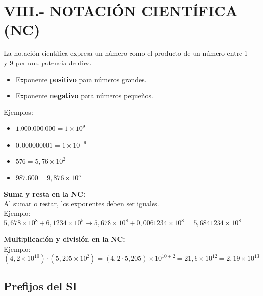 \documentclass[12pt,a4paper]{article}
\begin{document}
\section{VIII.- NOTACIÓN CIENTÍFICA (NC)}

La notación científica expresa un número como el producto de un número entre 1 y 9 por una potencia de diez. 
\begin{itemize}
    \item Exponente \textbf{positivo} para números grandes.
    \item Exponente \textbf{negativo} para números pequeños.
\end{itemize}

Ejemplos:
\begin{itemize}
    \item $1.000.000.000 = 1 \times 10^9$
    \item $0,000000001 = 1 \times 10^{-9}$
    \item $576 = 5,76 \times 10^2$
    \item $987.600 = 9,876 \times 10^5$
\end{itemize}

\textbf{Suma y resta en la NC:}\\
Al sumar o restar, los exponentes deben ser iguales.\\
Ejemplo: $5,678 \times 10^8 + 6,1234 \times 10^5 \rightarrow 5,678 \times 10^8 + 0,0061234 \times 10^8 = 5,6841234 \times 10^8$

\vspace{0.3cm}
\textbf{Multiplicación y división en la NC:}\\
Ejemplo: $(4,2 \times 10^{10}) \cdot (5,205 \times 10^2) = (4,2 \cdot 5,205) \times 10^{10+2} = 21,9 \times 10^{12} = 2,19 \times 10^{13}$

\subsection*{Prefijos del SI}
\end{document}
